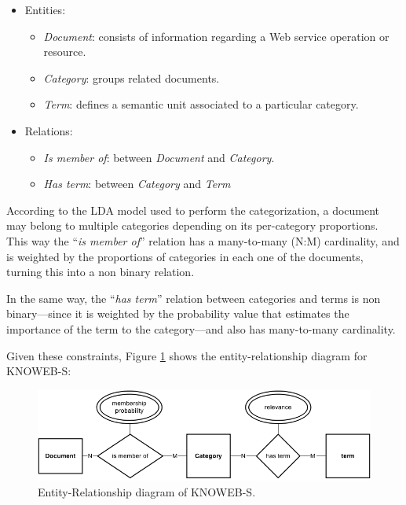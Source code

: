 \begin{itemize}
\item Entities: 
\begin{itemize}
\item \emph{Document}: consists of information regarding a Web service operation or resource. 
\item \emph{Category}: groups related documents. 
\item \emph{Term}: defines a semantic unit associated to a particular category.
\end{itemize}

\item Relations: 
\begin{itemize}
\item \emph{Is member of}: between \emph{Document} and \emph{Category}. 
\item \emph{Has term}: between \emph{Category} and \emph{Term}
\end{itemize}
\end{itemize}

According to the LDA model used to perform the categorization, a document may belong to multiple categories depending on its per-category proportions.
This way the ``\emph{is member of}'' relation has a many-to-many (N:M) cardinality, and is weighted by the proportions of categories in each one of the documents, turning this into a non binary relation.

In the same way, the ``\emph{has term}'' relation between categories and terms is non binary---since it is weighted by the probability value that estimates the importance of the term to the category---and also has many-to-many cardinality.

Given these constraints, Figure \ref{data-model-KNOWEBS} shows the entity-relationship diagram for KNOWEB-S:

\begin{figure}[H]
\includegraphics[scale=0.43]{images/KNOWEB-S-ER-en}

\caption{Entity-Relationship diagram of KNOWEB-S.}
\label{data-model-KNOWEBS}

\end{figure}


